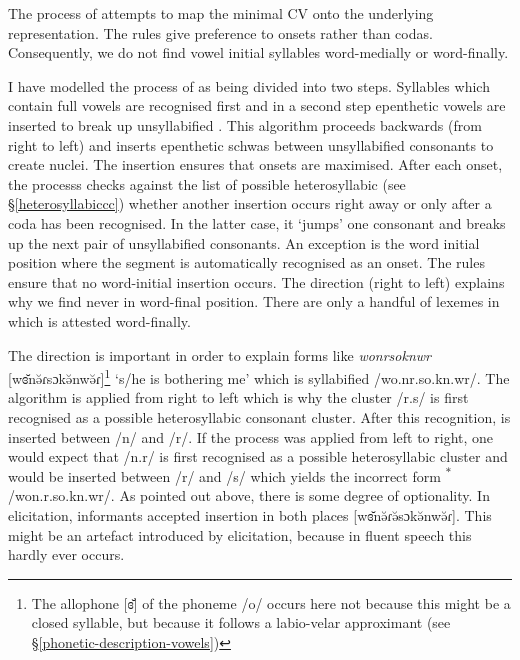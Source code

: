 The process of  attempts to map the minimal  CV onto the underlying representation. The rules give preference to onsets rather than codas. Consequently, we do not find vowel initial syllables word-medially or word-finally.%

I have modelled the process of  as being divided into two steps. Syllables which contain full vowels are recognised first and in a second step epenthetic vowels are inserted to break up unsyllabified . This algorithm proceeds backwards (from right to left) and inserts epenthetic schwas between unsyllabified consonants to create  nuclei. The insertion ensures that onsets are maximised. After each onset, the processs checks against the list of possible heterosyllabic  (see \S{}\ref{heterosyllabiccc}) whether another insertion occurs right away or only after a coda has been recognised. In the latter case, it `jumps' one consonant and breaks up the next pair of unsyllabified consonants. An exception is the word initial position where the segment is automatically recognised as an onset. The rules ensure that no word-initial  insertion occurs. The direction (right to left) explains why we find  never in word-final position. There are only a handful of lexemes in which  is attested word-finally.%

The direction is important in order to explain forms like \emph{wonrsoknwr} [wɞ̆nə̆ɾsɔkə̆nwə̆ɾ]\footnote{The allophone [ɞ̆] of the phoneme /o/ occurs here not because this might be a closed syllable, but because it follows a labio-velar approximant (see \S{}\ref{phonetic-description-vowels})} `s/he is bothering me' which is syllabified /wo.nr.so.kn.wr/. The algorithm is applied from right to left which is why the cluster /r.s/ is first recognised as a possible heterosyllabic consonant cluster. After this recognition,  is inserted between /n/ and /r/. If the process was applied from left to right, one would expect that /n.r/ is first recognised as a possible heterosyllabic cluster and  would be inserted between /r/ and /s/ which yields the incorrect form \textsuperscript{$\ast$}/won.r.so.kn.wr/. As pointed out above, there is some degree of optionality. In elicitation, informants accepted  insertion in both places [wɞ̆nə̆ɾə̆sɔkə̆nwə̆ɾ]. This might be an artefact introduced by elicitation, because in fluent speech this hardly ever occurs.%

